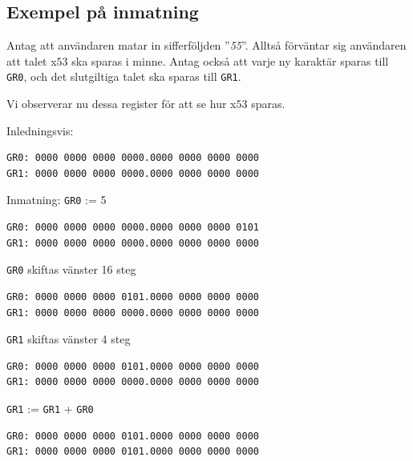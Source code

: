 \documentclass[]{article}
\begin{document}
\begin{appendices}
\section{Exempel på inmatning}\label{app:input_example}
Antag att användaren matar in sifferföljden ''\textit{55}''. Alltså förväntar sig användaren att talet x$53$ ska sparas i minne. Antag också att varje ny karaktär sparas till \texttt{GR0}, och det slutgiltiga talet ska sparas till \texttt{GR1}.

Vi observerar nu dessa register för att se hur x$53$ sparas.
\newline
\newline

\noindent
Inledningsvis:
\begin{framed}
\begin{verbatim}
GR0: 0000 0000 0000 0000.0000 0000 0000 0000
GR1: 0000 0000 0000 0000.0000 0000 0000 0000
\end{verbatim}
\end{framed}

\noindent
Inmatning: \texttt{GR0} := 5
\begin{framed}
\begin{verbatim}
GR0: 0000 0000 0000 0000.0000 0000 0000 0101
GR1: 0000 0000 0000 0000.0000 0000 0000 0000
\end{verbatim}
\end{framed}

\noindent
\texttt{GR0} skiftas vänster 16 steg
\begin{framed}
\begin{verbatim}
GR0: 0000 0000 0000 0101.0000 0000 0000 0000
GR1: 0000 0000 0000 0000.0000 0000 0000 0000
\end{verbatim}
\end{framed}

\noindent
\texttt{GR1} skiftas vänster 4 steg
\begin{framed}
\begin{verbatim}
GR0: 0000 0000 0000 0101.0000 0000 0000 0000
GR1: 0000 0000 0000 0000.0000 0000 0000 0000
\end{verbatim}
\end{framed}

\noindent
\texttt{GR1} := \texttt{GR1} + \texttt{GR0}
\begin{framed}
\begin{verbatim}
GR0: 0000 0000 0000 0101.0000 0000 0000 0000
GR1: 0000 0000 0000 0101.0000 0000 0000 0000
\end{verbatim}
\end{framed}


\end{appendices}
\end{document}
